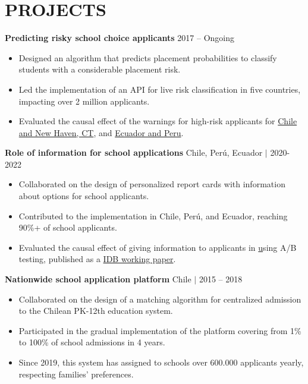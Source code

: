 \documentclass[letter,9pt]{extarticle}
\begin{document}


\section*{PROJECTS}

\noindent
\textbf{Predicting risky school choice applicants} \hfill   2017 – Ongoing 
\begin{itemize}
    \item Designed an algorithm that predicts placement probabilities to classify students with a considerable placement risk.
    \item Led the implementation of an API for live risk classification in five countries, impacting over 2 million applicants.
    \item Evaluated the causal effect of the warnings for high-risk applicants for \href{https://academic.oup.com/qje/article/137/3/1791/6544686?login=false}{Chile and New Haven, CT}, and  \href{https://publications.iadb.org/en/can-information-school-attributes-and-placement-probabilities-direct-search-and-choice-evidence}{Ecuador and Peru}.
\end{itemize}
\noindent
\textbf{Role of information for school applications} \hfill Chile, Perú, Ecuador $|$ 2020-2022
\begin{itemize}
    \item Collaborated on the design of personalized report cards with information about options for school applicants.
    \item Contributed to the implementation in Chile, Perú, and Ecuador, reaching 90\%+ of school applicants.
    \item Evaluated the causal effect of giving information to applicants in \href{https://publications.iadb.org/en/can-information-school-attributes-and-placement-probabilities-direct-search-and-choice-evidence} using A/B testing, published as a \href{https://publications.iadb.org/en/can-information-school-attributes-and-placement-probabilities-direct-search-and-choice-evidence}{IDB working paper}.
\end{itemize}

\noindent
\textbf{Nationwide school application platform} \hfill Chile $|$ 2015 – 2018
\begin{itemize}
    \item Collaborated on the design of a matching algorithm for centralized admission to the Chilean PK-12th education system.
    \item Participated in the gradual implementation of the platform covering from 1\% to 100\% of school admissions in 4 years.
    \item Since 2019, this system has assigned to schools over 600.000 applicants yearly, respecting families' preferences.
\end{itemize}
\end{document}
